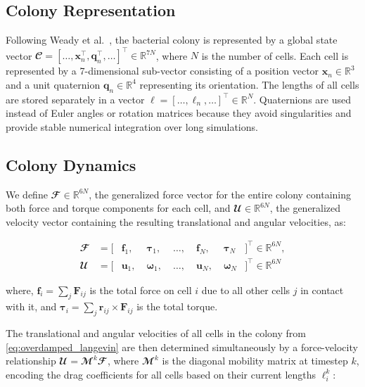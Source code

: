 \documentclass[a4paper,fleqn]{cas-dc}
\begin{document}
\subsection{Colony Representation}

Following Weady et al.~\cite{Weady2024SM}, the bacterial colony is represented by a global state vector $\mathbfcal{C} = [\dots, \mathbf{x}_n^\top, \mathbf{q}_n^\top, \dots]^\top \in \mathbb{R}^{7N}$, where $N$ is the number of cells. Each cell is represented by a 7-dimensional sub-vector consisting of a position vector $\mathbf{x}_n \in \mathbb{R}^3$ and a unit quaternion $\mathbf{q}_n \in \mathbb{R}^4$ representing its orientation. The lengths of all cells are stored separately in a vector $\boldsymbol{\ell} = [\dots, \ell_n, \dots]^\top \in \mathbb{R}^{N}$. Quaternions are used instead of Euler angles or rotation matrices because they avoid singularities and provide stable numerical integration over long simulations.

\subsection{Colony Dynamics}

We define $\mathbfcal{F} \in \mathbb{R}^{6N}$, the generalized force vector for the entire colony containing both force and torque components for each cell, and $\mathbfcal{U} \in \mathbb{R}^{6N}$, the generalized velocity vector containing the resulting translational and angular velocities, as:

\begin{equation}
    \begin{alignedat}{5}
        \mathbfcal{F} &= [&\mathbf{f}_1,&\;\boldsymbol{\tau}_1,&\;\dots,&\;\mathbf{f}_N,&\;\boldsymbol{\tau}_N&]^\top \in \mathbb{R}^{6N}, \\
        \mathbfcal{U} &= [&\mathbf{u}_1,&\;\boldsymbol{\omega}_1,&\;\dots,&\;\mathbf{u}_N,&\;\boldsymbol{\omega}_N&]^\top \in \mathbb{R}^{6N}
    \end{alignedat}
\end{equation}

where, $\mathbf{f}_i = \sum_j \mathbf{F}_{ij}$ is the total force on cell $i$ due to all other cells $j$ in contact with it, and $\boldsymbol{\tau}_i = \sum_j \mathbf{r}_{ij} \times \mathbf{F}_{ij}$ is the total torque. 

The translational and angular velocities of all cells in the colony from \autoref{eq:overdamped_langevin} are then determined simultaneously by a force-velocity relationship $\mathbfcal{U} = \mathbfcal{M}^k \mathbfcal{F}$, where $\mathbfcal{M}^k$ is the diagonal mobility matrix at timestep $k$, encoding the drag coefficients for all cells based on their current lengths $\ell_i^k$:
\end{document}
